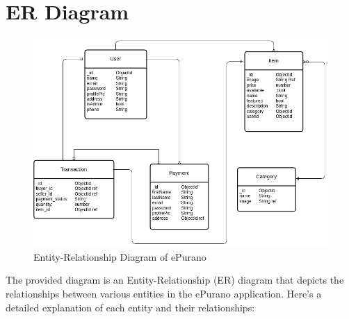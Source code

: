 \section{ER Diagram}
\begin{figure}[ht]
    \centering
    \includegraphics[scale=0.5]{../images/er.png}
    \caption{Entity-Relationship Diagram of ePurano}%
    \label{fig:er_diagram}
\end{figure}

The provided diagram is an Entity-Relationship (ER) diagram that depicts the relationships between various entities in the ePurano application. Here's a detailed explanation of each entity and their relationships:

